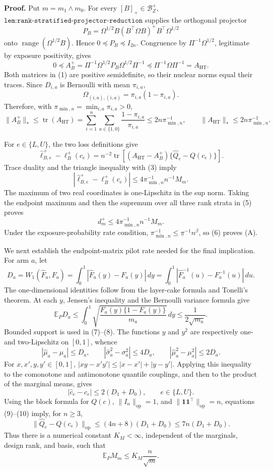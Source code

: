 \textbf{Proof.}
Put \(m=m_1\wedge m_0\).  For every \([B]_+\in\mathcal B_Z^+\), \(\texttt{lem:rank-stratified-projector-reduction}\) supplies the orthogonal projector
\[
P_B=\Omega^{1/2}B(B^{\top}\Omega B)^+B^{\top}\Omega^{1/2}
\]
onto \(\operatorname{range}(\Omega^{1/2}B)\).  Hence \(0\preceq P_B\preceq I_{2n}\).  Congruence by \(\Pi^{-1}\Omega^{1/2}\), legitimate by exposure positivity, gives
\[
0\preceq
A_B^+=\Pi^{-1}\Omega^{1/2}P_B\Omega^{1/2}\Pi^{-1}
\preceq
\Pi^{-1}\Omega\Pi^{-1}=A_{\mathrm{HT}}.
\tag{1}
\]
Both matrices in (1) are positive semidefinite, so their nuclear norms equal their traces.  Since \(D_{i,a}\) is Bernoulli with mean \(\pi_{i,a}\),
\[
\Omega_{(i,a),(i,a)}=\pi_{i,a}(1-\pi_{i,a}).
\tag{2}
\]
Therefore, with \(\pi_{\min,n}=\min_{i,a}\pi_{i,a}>0\),
\[
\lVert A_B^+\rVert_*
\le\operatorname{tr}(A_{\mathrm{HT}})
=\sum_{i=1}^n\sum_{a\in\{1,0\}}
\frac{1-\pi_{i,a}}{\pi_{i,a}}
\le2n\pi_{\min,n}^{-1},
\qquad
\lVert A_{\mathrm{HT}}\rVert_*
\le2n\pi_{\min,n}^{-1}.
\tag{3}
\]

For \(e\in\{L,U\}\), the two loss definitions give
\[
\widehat\ell_{B,e}^+-\ell_B^+(c_e)
=n^{-2}\operatorname{tr}\!\left[
(A_{\mathrm{HT}}-A_B^+)\{\widehat Q_e-Q(c_e)\}
\right].
\tag{4}
\]
Trace duality and the triangle inequality with (3) imply
\[
\left|\widehat\ell_{B,e}^+-\ell_B^+(c_e)\right|
\le4\pi_{\min,n}^{-1}n^{-1}M_m.
\tag{5}
\]
The maximum of two real coordinates is one-Lipschitz in the sup norm.  Taking the endpoint maximum and then the supremum over all three rank strata in (5) proves
\[
d_m^+\le4\pi_{\min,n}^{-1}n^{-1}M_m.
\tag{6}
\]
Under the exposure-probability rate condition,
\(\pi_{\min,n}^{-1}\le\underline\pi^{-1}n^\beta\), so (6) proves (A).

We next establish the endpoint-matrix pilot rate needed for the final implication.  For arm \(a\), let
\[
D_a=W_1(\widehat F_a,F_a)
=\int_0^1|\widehat F_a(y)-F_a(y)|\,dy
=\int_0^1|\widehat F_a^{-1}(u)-F_a^{-1}(u)|\,du.
\tag{7}
\]
The one-dimensional identities follow from the layer-cake formula and Tonelli's theorem.  At each \(y\), Jensen's inequality and the Bernoulli variance formula give
\[
\mathbb E_P D_a
\le\int_0^1\sqrt{\frac{F_a(y)\{1-F_a(y)\}}{m_a}}\,dy
\le\frac{1}{2\sqrt{m_a}}.
\tag{8}
\]
Bounded support is used in (7)--(8).  The functions \(y\) and \(y^2\) are respectively one- and two-Lipschitz on \([0,1]\), whence
\[
|\widehat\mu_a-\mu_a|\le D_a,
\qquad
|\widehat\sigma_a^2-\sigma_a^2|\le4D_a,
\qquad
|\widehat\mu_a^2-\mu_a^2|\le2D_a.
\tag{9}
\]
For \(x,x',y,y'\in[0,1]\),
\(|xy-x'y'|\le|x-x'|+|y-y'|\).  Applying this inequality to the comonotone and antimonotone quantile couplings, and then to the product of the marginal means, gives
\[
|\widehat c_e-c_e|\le2(D_1+D_0),
\qquad e\in\{L,U\}.
\tag{10}
\]
Using the block formula for \(Q(c)\), \(\lVert I_n\rVert_{\mathrm{op}}=1\), and \(\lVert\mathbf1\mathbf1^{\top}\rVert_{\mathrm{op}}=n\), equations (9)--(10) imply, for \(n\ge3\),
\[
\lVert\widehat Q_e-Q(c_e)\rVert_{\mathrm{op}}
\le(4n+8)(D_1+D_0)
\le7n(D_1+D_0).
\tag{11}
\]
Thus there is a numerical constant \(K_M<\infty\), independent of the marginals, design rank, and basis, such that
\[
\mathbb E_PM_m\le K_M\frac{n}{\sqrt m}.
\tag{12}
\]

